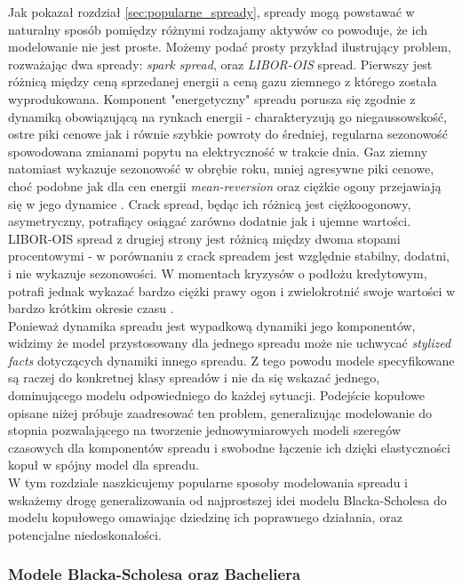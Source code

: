 Jak pokazał rozdział \ref{sec:popularne_spready}, spready mogą powstawać w naturalny sposób pomiędzy różnymi rodzajamy aktywów co powoduje, że ich modelowanie nie jest proste. Możemy podać prosty przykład ilustrujący problem, rozważając dwa spready: \emph{spark spread}, oraz \emph{LIBOR-OIS} spread. Pierwszy jest różnicą między ceną sprzedanej energii a ceną gazu ziemnego z którego została wyprodukowana. Komponent "energetyczny" spreadu porusza się zgodnie z dynamiką obowiązującą na rynkach energii - charakteryzują go niegaussowskość, ostre piki cenowe jak i równie szybkie powroty do średniej, regularna sezonowość spowodowana zmianami popytu na elektryczność w trakcie dnia. Gaz ziemny natomiast wykazuje sezonowość w obrębie roku, mniej agresywne piki cenowe, choć podobne jak dla cen energii \emph{mean-reversion} oraz ciężkie ogony przejawiają się w jego dynamice \cite{Espen_Crack_Spread_Copula}. Crack spread, będąc ich różnicą jest ciężkoogonowy, asymetryczny, potrafiący osiągać zarówno dodatnie jak i ujemne wartości. LIBOR-OIS spread z drugiej strony jest różnicą między dwoma stopami procentowymi - w porównaniu z crack spreadem jest względnie stabilny, dodatni, i nie wykazuje sezonowości. W momentach kryzysów o podłożu kredytowym, potrafi jednak wykazać bardzo ciężki prawy ogon i zwielokrotnić swoje wartości w bardzo krótkim okresie czasu \cite{Libor_OIS_model}.\\

Ponieważ dynamika spreadu jest wypadkową dynamiki jego komponentów, widzimy że model przystosowany dla jednego spreadu może nie uchwycać \emph{stylized facts} dotyczących dynamiki innego spreadu. Z tego powodu modele specyfikowane są raczej do konkretnej klasy spreadów i nie da się wskazać jednego, dominującego modelu odpowiedniego do każdej sytuacji. Podejście kopułowe opisane niżej próbuje zaadresować ten problem, generalizując modelowanie do stopnia pozwalającego na tworzenie jednowymiarowych modeli szeregów czasowych dla komponentów spreadu i swobodne łączenie ich dzięki elastyczności kopuł w spójny model dla spreadu.\\

W tym rozdziale naszkicujemy popularne sposoby modelowania spreadu i wskażemy drogę generalizowania od najprostszej idei modelu Blacka-Scholesa do modelu kopułowego omawiając dziedzinę ich poprawnego działania, oraz potencjalne niedoskonałości.

\subsubsection{Modele Blacka-Scholesa oraz Bacheliera}

